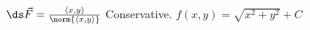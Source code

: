 {$\ds \vec{F} = \frac{\left<x, y\right>}{\norm{\left<x, y\right>}}$
}
{Conservative.  $f(x,y) = \sqrt{x^2 + y^2} + C$}
